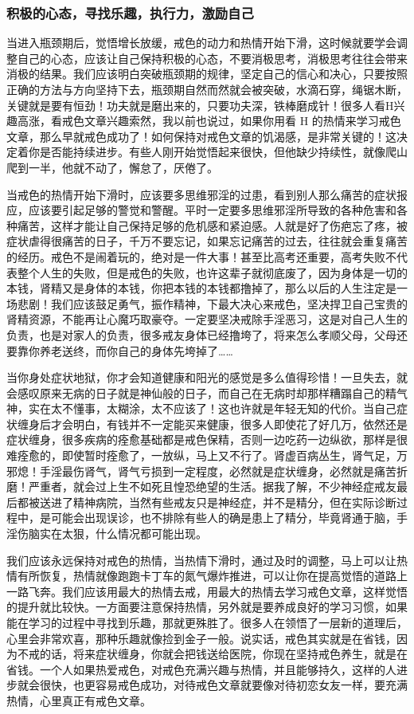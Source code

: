 \subsubsection{积极的心态，寻找乐趣，执行力，激励自己}

当进入瓶颈期后，觉悟增长放缓，戒色的动力和热情开始下滑，这时候就要学会调整自己的心态，应该让自己保持积极的心态，不要消极思考，消极思考往往会带来消极的结果。我们应该明白突破瓶颈期的规律，坚定自己的信心和决心，只要按照正确的方法与方向坚持下去，瓶颈期自然而然就会被突破，水滴石穿，绳锯木断，关键就是要有恒劲！功夫就是磨出来的，只要功夫深，铁棒磨成针！很多人看H兴趣高涨，看戒色文章兴趣索然，我以前也说过，如果你用看 H 的热情来学习戒色文章，那么早就戒色成功了！如何保持对戒色文章的饥渴感，是非常关键的！这决定着你是否能持续进步。有些人刚开始觉悟起来很快，但他缺少持续性，就像爬山爬到一半，他就不动了，懈怠了，厌倦了。

当戒色的热情开始下滑时，应该要多思维邪淫的过患，看到别人那么痛苦的症状报应，应该要引起足够的警觉和警醒。平时一定要多思维邪淫所导致的各种危害和各种痛苦，这样才能让自己保持足够的危机感和紧迫感。人就是好了伤疤忘了疼，被症状虐得很痛苦的日子，千万不要忘记，如果忘记痛苦的过去，往往就会重复痛苦的经历。戒色不是闹着玩的，绝对是一件大事！甚至比高考还重要，高考失败不代表整个人生的失败，但是戒色的失败，也许这辈子就彻底废了，因为身体是一切的本钱，肾精又是身体的本钱，你把本钱的本钱都撸掉了，那么以后的人生注定是一场悲剧！我们应该鼓足勇气，振作精神，下最大决心来戒色，坚决捍卫自己宝贵的肾精资源，不能再让心魔巧取豪夺。一定要坚决戒除手淫恶习，这是对自己人生的负责，也是对家人的负责，很多戒友身体已经撸垮了，将来怎么孝顺父母，父母还要靠你养老送终，而你自己的身体先垮掉了……

当你身处症状地狱，你才会知道健康和阳光的感觉是多么值得珍惜！一旦失去，就会感叹原来无病的日子就是神仙般的日子，而自己在无病时却那样糟蹋自己的精气神，实在太不懂事，太糊涂，太不应该了！这也许就是年轻无知的代价。当自己症状缠身后才会明白，有钱并不一定能买来健康，很多人即使花了好几万，依然还是症状缠身，很多疾病的痊愈基础都是戒色保精，否则一边吃药一边纵欲，那样是很难痊愈的，即使暂时痊愈了，一放纵，马上又不行了。肾虚百病丛生，肾气足，万邪熄！手淫最伤肾气，肾气亏损到一定程度，必然就是症状缠身，必然就是痛苦折磨！严重者，就会过上生不如死且惶恐绝望的生活。据我了解，不少神经症戒友最后都被送进了精神病院，当然有些戒友只是神经症，并不是精分，但在实际诊断过程中，是可能会出现误诊，也不排除有些人的确是患上了精分，毕竟肾通于脑，手淫伤脑实在太狠，什么情况都可能出现。

我们应该永远保持对戒色的热情，当热情下滑时，通过及时的调整，马上可以让热情有所恢复，热情就像跑跑卡丁车的氮气爆炸推进，可以让你在提高觉悟的道路上一路飞奔。我们应该用最大的热情去戒，用最大的热情去学习戒色文章，这样觉悟的提升就比较快。一方面要注意保持热情，另外就是要养成良好的学习习惯，如果能在学习的过程中寻找到乐趣，那就更殊胜了。很多人在领悟了一层新的道理后，心里会非常欢喜，那种乐趣就像捡到金子一般。说实话，戒色其实就是在省钱，因为不戒的话，将来症状缠身，你就会把钱送给医院，你现在坚持戒色养生，就是在省钱。一个人如果热爱戒色，对戒色充满兴趣与热情，并且能够持久，这样的人进步就会很快，也更容易戒色成功，对待戒色文章就要像对待初恋女友一样，要充满热情，心里真正有戒色文章。

